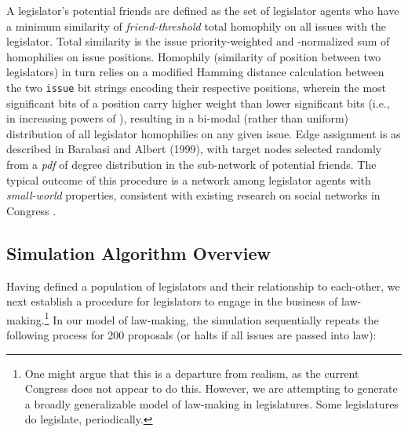 \documentclass[pdftex,12pt]{llncs}
\begin{document}
A legislator's potential friends are defined as the set of legislator agents who have a minimum similarity of \textit{friend-threshold} total homophily on all issues with the legislator.  Total similarity is the issue priority-weighted and -normalized sum of homophilies on issue positions.  Homophily (similarity of position between two legislators) in turn relies on a modified Hamming distance calculation between the two \texttt{issue} bit strings encoding their respective positions, wherein the most significant bits of a position carry higher weight than lower significant bits (i.e., in increasing powers of ), resulting in a bi-modal (rather than uniform) distribution of all legislator homophilies on any given issue.
Edge assignment is as described in Barabasi and Albert (1999), with target nodes selected randomly from a \textit{pdf} of degree distribution in the sub-network of potential friends. 
The typical outcome of this procedure is a network among legislator agents with \textit{small-world} properties, consistent with existing research on social networks in Congress \parencite{Granovetter1978}.

\subsection{Simulation Algorithm Overview}
Having defined a population of legislators and their relationship to each-other, we next establish a procedure for legislators to engage in the business of law-making.\footnote{One might argue that this is a departure from realism, as the current Congress does not appear to do this. However, we are attempting to generate a broadly generalizable model of law-making in legislatures. Some legislatures do legislate, periodically.}  In our model of law-making, the simulation sequentially repeats the following process for 200 proposals (or halts if all issues are passed into law): 
\end{document}
